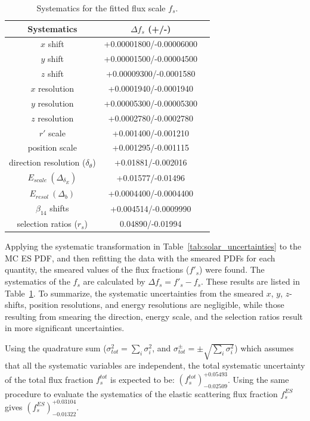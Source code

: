 \begin{table}[ht]
	\centering
	\caption{Systematics for the fitted flux scale $f_s$.\label{tab:smearingResults}}
					\vspace{1mm}
	\begin{tabular*}{90mm}{c@{\extracolsep{\fill}}cc}
		\toprule
		Systematics & $\Delta f_s$ (+/-)\\
		\hline
		$x$ shift & +0.00001800/-0.00006000\\	
		$y$ shift & +0.00001500/-0.00004500\\
		$z$ shift & +0.00009300/-0.0001580\\
		$x$ resolution & +0.0001940/-0.0001940\\	
		$y$ resolution & +0.00005300/-0.00005300\\
		$z$ resolution & +0.0002780/-0.0002780\\
		$r'$ scale & +0.001400/-0.001210\\
		position scale & +0.001295/-0.001115\\	
		direction resolution ($\delta_\theta$)  &+0.01881/-0.002016\\		
		$E_{scale}~(\Delta_{\delta_E})$ & +0.01577/-0.01496\\
		$E_{resol}~(\Delta_b)$ & +0.0004400/-0.0004400 \\
		$\beta_{14}$ shifts & +0.004514/-0.0009990\\
		selection ratios ($r_s$) & 0.04890/-0.01994\\
		\bottomrule
	\end{tabular*}
\end{table}

Applying the systematic transformation in Table~\ref{tab:solar_uncertainties} to the MC ES PDF, and then refitting the data with the smeared PDFs for each quantity, the smeared values of the flux fractions ($f'_s$) were found. The systematics of the $f_s$ are calculated by $\Delta f_s =f'_s-f_s$. These results are listed in Table~\ref{tab:smearingResults}. To summarize, the systematic uncertainties from the smeared $x$, $y$, $z$-shifts, position resolutions, and energy resolutions are negligible, while those resulting from smearing the direction, energy scale, and the selection ratios result in more significant uncertainties. 

Using the quadrature sum ($\sigma^2_{tot}=\sum_i \sigma^2_i$, and $\sigma_{tot}^\pm=\pm\sqrt{\sum_i \sigma^2_i}$) which assumes that all the systematic variables are independent, the total systematic uncertainty of the total flux fraction $f^{tot}_s$ is expected to be: $({f^{tot}_s})^{+0.05493}_{-0.02509}$. Using the same procedure to evaluate the systematics of the elastic scattering flux fraction $f^{ES}_s$ gives $({f^{ES}_s})^{+0.03104}_{-0.01322}$.

